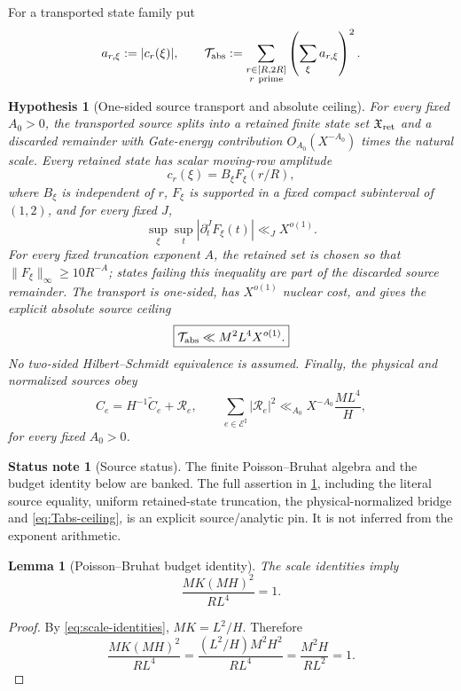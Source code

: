 \documentclass[11pt]{article}
\newtheorem{lemma}[lemma]{Lemma}
\newtheorem{hypothesis}[hypothesis]{Hypothesis}
\theoremstyle{definition}
\newtheorem{status}[status]{Status note}
\newcommand{\1}{\mathbf 1}
\begin{document}
For a transported state family put
\[
 a_{r,\xi}:=|c_r(\xi)|,
 \qquad
 \mathcal T_{\rm abs}:=
 \sum_{\substack{r\in[R,2R]\\ r\ \mathrm{prime}}}
      \left(\sum_{\xi} a_{r,\xi}\right)^2.
\]

\begin{hypothesis}[One-sided source transport and absolute ceiling]
\label{hyp:PB}
For every fixed $A_0>0$, the transported source splits into a retained finite
state set $\mathfrak X_{\rm ret}$ and a discarded remainder with Gate-energy
contribution $O_{A_0}(X^{-A_0})$ times the natural scale.  Every retained state
has scalar moving-row amplitude
\begin{equation}
   c_r(\xi)=B_{\xi}F_{\xi}(r/R),
   \label{eq:smooth-envelope}
\end{equation}
where $B_{\xi}$ is independent of $r$, $F_{\xi}$ is supported in a fixed compact
subinterval of $(1,2)$, and for every fixed $J$,
\[
   \sup_{\xi}\sup_t |\partial_t^J F_{\xi}(t)|\ll_J X^{o(1)}.
\]
For every fixed truncation exponent $A$, the retained set is chosen so that
$\|F_{\xi}\|_\infty\ge 10R^{-A}$; states failing this inequality are part of
the discarded source remainder.  The transport is one-sided, has $X^{o(1)}$
nuclear cost, and gives the explicit absolute source ceiling
\begin{equation}
   \boxed{\mathcal T_{\rm abs}\ll M^2L^4X^{o(1)}.}
   \label{eq:Tabs-ceiling}
\end{equation}
No two-sided Hilbert--Schmidt equivalence is assumed.  Finally, the physical
and normalized sources obey
\[
   C_e=H^{-1}\widetilde C_e+\mathcal R_e,
   \qquad
   \sum_{e\in\mathcal E^\sharp}|\mathcal R_e|^2
     \ll_{A_0} X^{-A_0}\frac{ML^4}{H},
\]
for every fixed $A_0>0$.
\end{hypothesis}

\begin{status}[Source status]
The finite Poisson--Bruhat algebra and the budget identity below are banked.
The full assertion in \cref{hyp:PB}, including the literal source equality,
uniform retained-state truncation, the physical-normalized bridge and \eqref{eq:Tabs-ceiling}, is an explicit
source/analytic pin.  It is not inferred from the exponent arithmetic.
\end{status}

\begin{lemma}[Poisson--Bruhat budget identity]
\label{lem:PB-budget}
The scale identities imply
\[
   \boxed{\frac{MK(MH)^2}{RL^4}=1.}
\]
\end{lemma}
\begin{proof}
By \eqref{eq:scale-identities}, $MK=L^2/H$.  Therefore
\[
 \frac{MK(MH)^2}{RL^4}
 =\frac{(L^2/H)M^2H^2}{RL^4}
 =\frac{M^2H}{RL^2}=1.
\]
\end{proof}
\end{document}
